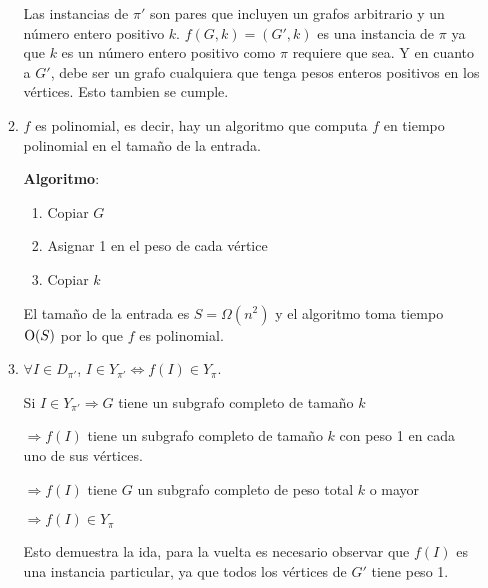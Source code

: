 \begin{enumerate}
\begin{enumerate}
Las instancias de $\pi'$ son pares que incluyen un grafos arbitrario y un
número entero positivo $k$. $f(G, k) = (G', k)$ es una instancia de $\pi$ ya
que $k$ es un número entero positivo como $\pi$ requiere que sea. Y en cuanto
a $G'$, debe ser un grafo cualquiera que tenga pesos enteros positivos en los
vértices. Esto tambien se cumple.

\item
$f$ es polinomial, es decir, hay un algoritmo que computa $f$ en tiempo
polinomial en el tamaño de la entrada.

\textbf{Algoritmo}:

\begin{enumerate}
\item Copiar $G$
\item Asignar 1 en el peso de cada vértice
\item Copiar $k$
\end{enumerate}

El tamaño de la entrada es $S = \Omega(n^2)$ y el algoritmo toma tiempo
$\operatorname{O}(S)$ por lo que $f$ es polinomial.

\item
$\forall I \in D_{\pi'}$, $I \in Y_{\pi'} \Longleftrightarrow f(I) \in Y_\pi$.

Si $I \in Y_{\pi'} \Longrightarrow G$ tiene un subgrafo completo de tamaño $k$

$\Longrightarrow f(I)$ tiene un subgrafo completo de tamaño $k$ con peso 1 en
cada uno de sus vértices.

$\Longrightarrow f(I)$ tiene $G$ un subgrafo completo de peso total $k$ o
mayor

$\Longrightarrow f(I) \in Y_\pi$

Esto demuestra la ida, para la vuelta es necesario observar que $f(I)$ es
una instancia particular, ya que todos los vértices de $G'$ tiene peso 1.


\end{enumerate}
\end{enumerate}